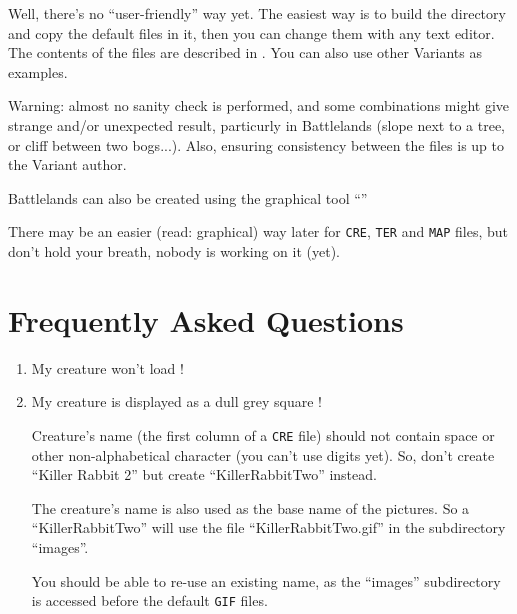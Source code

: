 \documentclass{article}
\begin{document}
Well, there's no ``user-friendly'' way yet. The easiest way is
to build the directory and copy the default files in it,
then you can change them with any text editor. The contents
of the files are described in
.
You can also use other Variants as examples.

Warning: almost no sanity check is performed, and some
combinations might give strange and/or unexpected result,
particurly in Battlelands (slope next to a tree, or
cliff between two bogs...). Also, ensuring consistency
between the files is up to the Variant author.

Battlelands can also be created using the graphical tool
``''

There may be an easier (read: graphical) way later for
\texttt{CRE}, \texttt{TER} and \texttt{MAP} files, but don't hold your breath, nobody
is working on it (yet).

\section{Frequently Asked Questions}

\begin{enumerate}

\item My creature won't load !
\item My creature is displayed as a dull grey square !

Creature's name (the first column of a \texttt{CRE} file) should not
contain space or other non-alphabetical character (you
can't use digits yet). So, don't create ``Killer Rabbit 2''
but create ``KillerRabbitTwo'' instead.

The creature's name is also used as the base name
of the pictures. So a ``KillerRabbitTwo'' will use
the file ``KillerRabbitTwo.gif'' in the subdirectory
``images''.

You should be able to re-use an existing name, as
the ``images'' subdirectory is accessed before the default
\texttt{GIF} files.

\end{enumerate}
\end{document}
